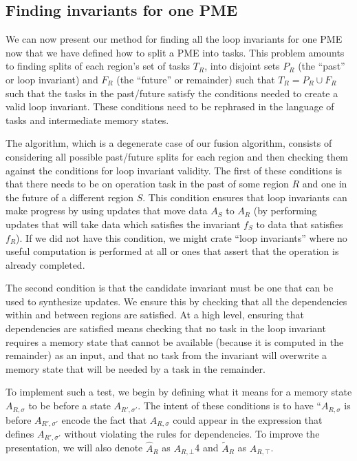 \documentclass[12pt,letterpaper]{article}
\newcommand*{\opf}{f}
\begin{document}
\subsection{Finding invariants for one PME}
We can now present our method for finding all the loop invariants for one PME now that we have defined how to split a PME into tasks.
This problem amounts to finding splits of each region's set of tasks $T_R$, into disjoint sets $P_R$ (the ``past'' or loop invariant) and $F_R$ (the ``future'' or remainder) such that $T_R = P_R \cup F_R$ such that the tasks in the past/future satisfy the conditions needed to create a valid loop invariant.
These conditions need to be rephrased in the language of tasks and intermediate memory states.

The algorithm, which is a degenerate case of our fusion algorithm, consists of considering all possible past/future splits for each region and then checking them against the conditions for loop invariant validity.
The first of these conditions is that there needs to be on operation task in the past of some region $R$ and one in the future of a different region $S$.
This condition ensures that loop invariants can make progress by using updates that move data $A_S$ to $A_R$ (by performing updates that will take data which satisfies the invariant $\opf_S$ to data that satisfies $\opf_R$).
If we did not have this condition, we might crate ``loop invariants'' where no useful computation is performed at all or ones that assert that the operation is already completed.

The second condition is that the candidate invariant must be one that can be used to synthesize updates.
We ensure this by checking that all the dependencies within and between regions are satisfied.
At a high level, ensuring that dependencies are satisfied means checking that no task in the loop invariant requires a memory state that cannot be available (because it is computed in the remainder) as an input, and that no task from the invariant will overwrite a memory state that will be needed by a task in the remainder.

To implement such a test, we begin by defining what it means for a memory state $A_{R, \sigma}$ to be before a state $A_{R', \sigma'}$.
The intent of these conditions is to have ``$A_{R, \sigma}$ is before $A_{R', \sigma'}$ encode the fact that $A_{R, \sigma}$ could appear in the expression that defines $A_{R', \sigma'}$ without violating the rules for dependencies.
To improve the presentation, we will also denote $\hat{A}_R$ as $A_{R, \bot}$4 and $\widetilde{A}_R$ as $A_{R, \top}$.
\end{document}
